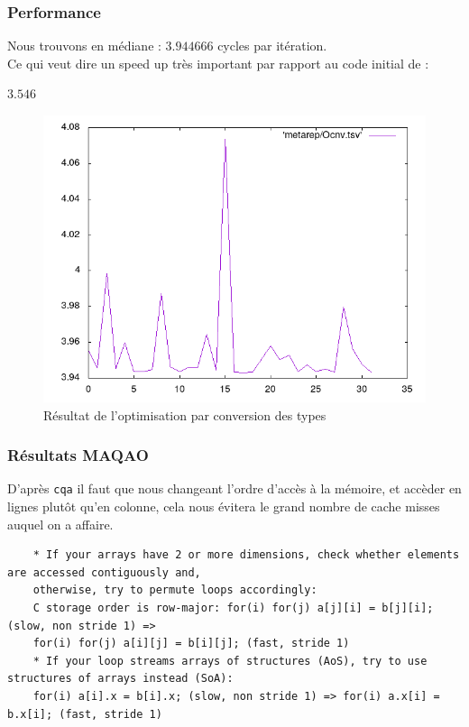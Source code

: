 \documentclass{report}
\begin{document}
  \subsubsection{Performance}
  Nous trouvons en médiane : $3.944666$ cycles par itération.\\
  Ce qui veut dire un speed up très important par rapport au code initial de :
  \begin{center}
      $3.546$
  \end{center}
  \begin{figure}[ht!]
    \centering
    \includegraphics[scale=0.45]{../metarep/Ocnv.png}
    \caption{Résultat de l'optimisation par conversion des types}
  \end{figure}
  \subsubsection{Résultats MAQAO}
  D'après \texttt{cqa} il faut que nous changeant l'ordre d'accès à la mémoire, et accèder en lignes
  plutôt qu'en colonne, cela nous évitera le grand nombre de cache misses auquel on a affaire.
  \begin{verbatim}
    * If your arrays have 2 or more dimensions, check whether elements are accessed contiguously and,
    otherwise, try to permute loops accordingly:
    C storage order is row-major: for(i) for(j) a[j][i] = b[j][i]; (slow, non stride 1) =>
    for(i) for(j) a[i][j] = b[i][j]; (fast, stride 1)
    * If your loop streams arrays of structures (AoS), try to use structures of arrays instead (SoA):
    for(i) a[i].x = b[i].x; (slow, non stride 1) => for(i) a.x[i] = b.x[i]; (fast, stride 1)

  \end{verbatim}
\end{document}

